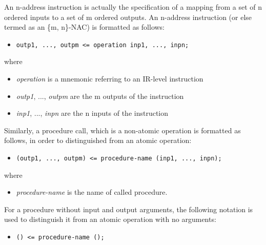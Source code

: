 \documentclass[a4paper]{article}
\begin{document}
An n-address instruction is actually the specification of a mapping from
a set of n ordered inputs to a set of m ordered outputs. An n-address
instruction (or else termed as an \{m, n\}-NAC) is formatted as follows:
%
\begin{itemize}

\item \texttt{outp1, ..., outpm <= operation inp1, ..., inpn;}

\end{itemize}

where
%
\begin{itemize}

\item \emph{operation} is a mnemonic referring to an IR-level instruction

\item \emph{outp1}, ..., \emph{outpm} are the m outputs of the instruction

\item \emph{inp1}, ..., \emph{inpn} are the n inputs of the instruction

\end{itemize}

Similarly, a procedure call, which is a non-atomic operation is formatted
as follows, in order to distinguished from an atomic operation:
%
\begin{itemize}

\item \texttt{(outp1, ..., outpm) <= procedure-name (inp1, ..., inpn);}

\end{itemize}

where
%
\begin{itemize}

\item \emph{procedure-name} is the name of called procedure.

\end{itemize}

For a procedure without input and output arguments, the following notation
is used to distinguish it from an atomic operation with no arguments:
%
\begin{itemize}

\item \texttt{() <= procedure-name ();}

\end{itemize}
\end{document}
